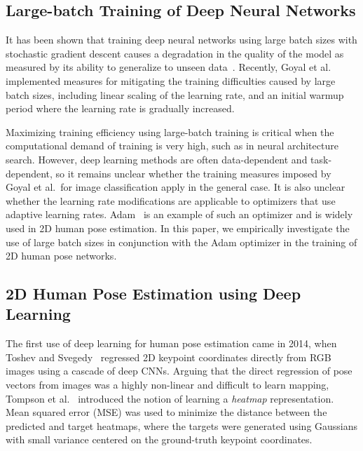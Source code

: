 \documentclass{ieeeaccess}
\begin{document}
\subsection{Large-batch Training of Deep Neural Networks}
It has been shown that training deep neural networks using large batch sizes with stochastic gradient descent causes a degradation in the quality of the model as measured by its ability to generalize to unseen data~\cite{hoffer2017train, keskar2016large}. Recently, Goyal et al.\ \cite{goyal2017accurate} implemented measures for mitigating the training difficulties caused by large batch sizes, including linear scaling of the learning rate, and an initial warmup period where the learning rate is gradually increased. 

Maximizing training efficiency using large-batch training is critical when the computational demand of training is very high, such as in neural architecture search. However, deep learning methods are often data-dependent and task-dependent, so it remains unclear whether the training measures imposed by Goyal et al.\ for image classification apply in the general case. It is also unclear whether the learning rate modifications are applicable to optimizers that use adaptive learning rates. Adam~\cite{kingma2014adam} is an example of such an optimizer and is widely used in 2D human pose estimation. In this paper, we empirically investigate the use of large batch sizes in conjunction with the Adam optimizer in the training of 2D human pose networks.










\subsection{2D Human Pose Estimation using Deep Learning} The first use of deep learning for human pose estimation came in 2014, when Toshev and Svegedy~\cite{toshev2014deeppose} regressed 2D keypoint coordinates directly from RGB images using a cascade of deep CNNs. Arguing that the direct regression of pose vectors from images was a highly non-linear and difficult to learn mapping, Tompson et al.\ \cite{tompson2014joint} introduced the notion of learning a \textit{heatmap} representation. Mean squared error (MSE) was used to minimize the distance between the predicted and target heatmaps, where the targets were generated using Gaussians with small variance centered on the ground-truth keypoint coordinates. 
\end{document}
